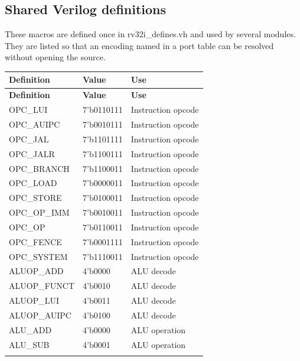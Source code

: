 \documentclass[11pt]{article}
\begin{document}
\subsection{Shared Verilog definitions}
\noindent These macros are defined once in rv32i\_defines.vh and used by several modules. They are listed so that an encoding named in a port table can be resolved without opening the source.\par\medskip
{\small
\begin{longtable}{@{}L{0.4200\dimexpr\linewidth-24pt\relax}L{0.2500\dimexpr\linewidth-24pt\relax}L{0.3300\dimexpr\linewidth-24pt\relax}@{}}
\toprule
\textbf{Definition} & \textbf{Value} & \textbf{Use} \\ \midrule
\endfirsthead
\toprule
\textbf{Definition} & \textbf{Value} & \textbf{Use} \\ \midrule
\endhead
OPC\_LUI & 7'b0110111 & Instruction opcode \\ \addlinespace[3pt]
OPC\_AUIPC & 7'b0010111 & Instruction opcode \\ \addlinespace[3pt]
OPC\_JAL & 7'b1101111 & Instruction opcode \\ \addlinespace[3pt]
OPC\_JALR & 7'b1100111 & Instruction opcode \\ \addlinespace[3pt]
OPC\_BRANCH & 7'b1100011 & Instruction opcode \\ \addlinespace[3pt]
OPC\_LOAD & 7'b0000011 & Instruction opcode \\ \addlinespace[3pt]
OPC\_STORE & 7'b0100011 & Instruction opcode \\ \addlinespace[3pt]
OPC\_OP\_IMM & 7'b0010011 & Instruction opcode \\ \addlinespace[3pt]
OPC\_OP & 7'b0110011 & Instruction opcode \\ \addlinespace[3pt]
OPC\_FENCE & 7'b0001111 & Instruction opcode \\ \addlinespace[3pt]
OPC\_SYSTEM & 7'b1110011 & Instruction opcode \\ \addlinespace[3pt]
ALUOP\_ADD & 4'b0000 & ALU decode \\ \addlinespace[3pt]
ALUOP\_FUNCT & 4'b0010 & ALU decode \\ \addlinespace[3pt]
ALUOP\_LUI & 4'b0011 & ALU decode \\ \addlinespace[3pt]
ALUOP\_AUIPC & 4'b0100 & ALU decode \\ \addlinespace[3pt]
ALU\_ADD & 4'b0000 & ALU operation \\ \addlinespace[3pt]
ALU\_SUB & 4'b0001 & ALU operation \\ \addlinespace[3pt]

\end{longtable}}
\end{document}
